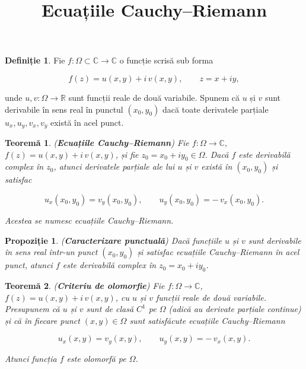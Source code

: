 \documentclass[12pt]{article}
\title{Ecuațiile Cauchy--Riemann}
\author{}
\date{}
\theoremstyle{definition}
\newtheorem{definition}{Definiție}
\theoremstyle{plain}
\newtheorem{theorem}{Teoremă}
\newtheorem{proposition}{Propoziție}
\begin{document}
\maketitle

\begin{definition}
Fie $f:\Omega \subset \mathbb{C} \to \mathbb{C}$ o funcție scrisă sub forma


\[
f(z) = u(x,y) + i\, v(x,y), \qquad z = x + i y,
\]


unde $u, v : \Omega \to \mathbb{R}$ sunt funcții reale de două variabile.
Spunem că $u$ și $v$ sunt derivabile în sens real în punctul $(x_0,y_0)$ dacă toate derivatele parțiale
$u_x, u_y, v_x, v_y$ există în acel punct.
\end{definition}

\begin{theorem}
(\textbf{Ecuațiile Cauchy--Riemann})  
Fie $f:\Omega \to \mathbb{C}$, $f(z)=u(x,y)+i\,v(x,y)$, și fie $z_0=x_0+iy_0 \in \Omega$.
Dacă $f$ este derivabilă complex în $z_0$, atunci derivatele parțiale ale lui $u$ și $v$ există în $(x_0,y_0)$ și satisfac


\[
u_x(x_0,y_0) = v_y(x_0,y_0), \qquad
u_y(x_0,y_0) = -\, v_x(x_0,y_0).
\]


Acestea se numesc \emph{ecuațiile Cauchy--Riemann}.
\end{theorem}

\begin{proposition}
(\textbf{Caracterizare punctuală})  
Dacă funcțiile $u$ și $v$ sunt derivabile în sens real într-un punct $(x_0,y_0)$ și satisfac ecuațiile Cauchy--Riemann în acel punct, atunci $f$ este derivabilă complex în $z_0 = x_0 + i y_0$.
\end{proposition}

\begin{theorem}
(\textbf{Criteriu de olomorfie})  
Fie $f:\Omega \to \mathbb{C}$, $f(z)=u(x,y)+i\,v(x,y)$, cu $u$ și $v$ funcții reale de două variabile.
Presupunem că $u$ și $v$ sunt de clasă $C^1$ pe $\Omega$ (adică au derivate parțiale continue) și că în fiecare punct $(x,y) \in \Omega$ sunt satisfăcute ecuațiile Cauchy--Riemann


\[
u_x(x,y) = v_y(x,y), \qquad
u_y(x,y) = -\, v_x(x,y).
\]


Atunci funcția $f$ este olomorfă pe $\Omega$.
\end{theorem}
\end{document}
